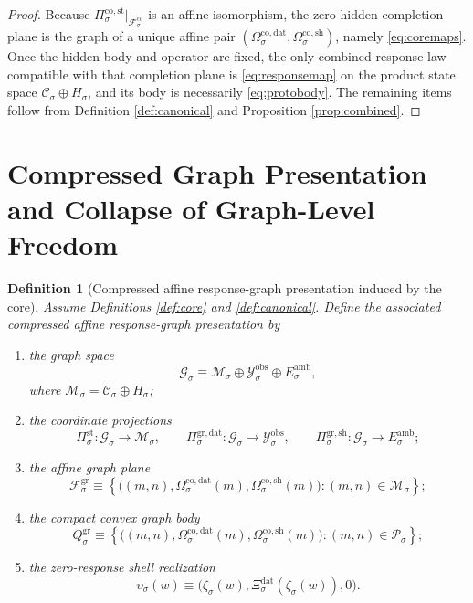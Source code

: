 \documentclass[11pt]{article}
\newcommand{\DataSpace}[1]{\mathcal Y_{#1}^{\mathrm{obs}}}
\newcommand{\AmbientTarget}[1]{E_{#1}^{\mathrm{amb}}}
\newcommand{\ProtoSpace}[1]{\mathcal M_{#1}}
\newcommand{\ProtoBody}[1]{\mathcal P_{#1}}
\newcommand{\ResponseData}[1]{\Xi_{#1}^{\mathrm{dat}}}
\newcommand{\GapSpace}[1]{H_{#1}}
\newcommand{\ProtoEmbed}[1]{\zeta_{#1}}
\newcommand{\CoreState}[1]{\mathcal C_{#1}}
\newcommand{\CoreAffine}[1]{\mathcal F_{#1}^{\mathrm{co}}}
\newcommand{\CoreStateProj}[1]{\Pi_{#1}^{\mathrm{co,st}}}
\newcommand{\CoreDataMap}[1]{\Omega_{#1}^{\mathrm{co,dat}}}
\newcommand{\CoreShellMap}[1]{\Omega_{#1}^{\mathrm{co,sh}}}
\newcommand{\GraphSpace}[1]{\mathcal G_{#1}}
\newcommand{\GraphAffine}[1]{\mathcal F_{#1}^{\mathrm{gr}}}
\newcommand{\GraphBody}[1]{Q_{#1}^{\mathrm{gr}}}
\newcommand{\StateProj}[1]{\Pi_{#1}^{\mathrm{st}}}
\newcommand{\GraphDataProj}[1]{\Pi_{#1}^{\mathrm{gr,dat}}}
\newcommand{\GraphShellProj}[1]{\Pi_{#1}^{\mathrm{gr,sh}}}
\newcommand{\GraphEmbed}[1]{\upsilon_{#1}}
\newtheorem{definition}{Definition}
\begin{document}
\begin{proof}
Because \(\CoreStateProj{\sigma}\big|_{\CoreAffine{\sigma}}\) is an affine isomorphism, the zero-hidden completion plane is the graph of a unique affine pair \((\CoreDataMap{\sigma},\CoreShellMap{\sigma})\), namely \eqref{eq:coremaps}. Once the hidden body and operator are fixed, the only combined response law compatible with that completion plane is \eqref{eq:responsemap} on the product state space \(\CoreState{\sigma}\oplus\GapSpace{\sigma}\), and its body is necessarily \eqref{eq:protobody}. The remaining items follow from Definition \ref{def:canonical} and Proposition \ref{prop:combined}.
\end{proof}

\section{Compressed Graph Presentation and Collapse of Graph-Level Freedom}

\begin{definition}[Compressed affine response-graph presentation induced by the core]
\label{def:graph}
Assume Definitions \ref{def:core} and \ref{def:canonical}. Define the associated compressed affine response-graph presentation by
\begin{enumerate}
    \item the graph space
    \[
    \GraphSpace{\sigma}
    \equiv
    \ProtoSpace{\sigma}\oplus \DataSpace{\sigma}\oplus \AmbientTarget{\sigma},
    \]
    where \(\ProtoSpace{\sigma}=\CoreState{\sigma}\oplus\GapSpace{\sigma}\);
    \item the coordinate projections
    \[
    \StateProj{\sigma}:\GraphSpace{\sigma}\to \ProtoSpace{\sigma},
    \qquad
    \GraphDataProj{\sigma}:\GraphSpace{\sigma}\to \DataSpace{\sigma},
    \qquad
    \GraphShellProj{\sigma}:\GraphSpace{\sigma}\to \AmbientTarget{\sigma};
    \]
    \item the affine graph plane
    \begin{equation}
    \GraphAffine{\sigma}
    \equiv
    \left\{
    \bigl(
    (m,n),
    \CoreDataMap{\sigma}(m),
    \CoreShellMap{\sigma}(m)
    \bigr):
    (m,n)\in \ProtoSpace{\sigma}
    \right\};
    \label{eq:graphplane}
    \end{equation}
    \item the compact convex graph body
    \begin{equation}
    \GraphBody{\sigma}
    \equiv
    \left\{
    \bigl(
    (m,n),
    \CoreDataMap{\sigma}(m),
    \CoreShellMap{\sigma}(m)
    \bigr):
    (m,n)\in \ProtoBody{\sigma}
    \right\};
    \label{eq:graphbody}
    \end{equation}
    \item the zero-response shell realization
    \begin{equation}
    \GraphEmbed{\sigma}(w)
    \equiv
    \bigl(
    \ProtoEmbed{\sigma}(w),
    \ResponseData{\sigma}(\ProtoEmbed{\sigma}(w)),
    0
    \bigr).
    \label{eq:graphembed}
    \end{equation}
\end{enumerate}
\end{definition}
\end{document}
